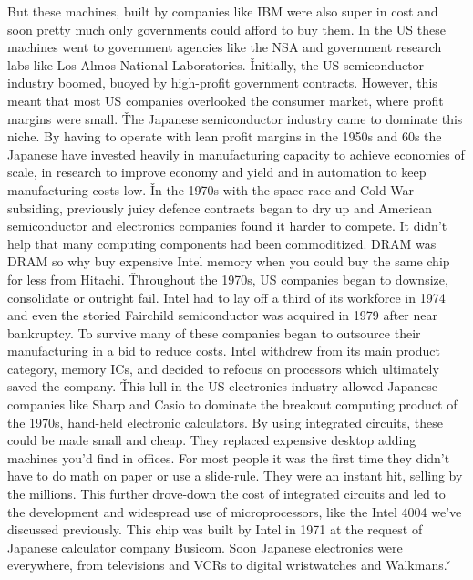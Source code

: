 But these machines, built by companies like IBM were also super in cost and soon pretty much only governments could
afford to buy them. In the US these machines went to government agencies like the NSA and government research labs
like Los Almos National Laboratories. \v

Initially, the US semiconductor industry boomed, buoyed by high-profit government contracts. However, this meant that
most US companies overlooked the consumer market, where profit margins were small. \v

The Japanese semiconductor industry came to dominate this niche. By having to operate with lean profit margins in the
1950s and 60s the Japanese have invested heavily in manufacturing capacity to achieve economies of scale, in research
to improve economy and yield and in automation to keep manufacturing costs low. \v

In the 1970s with the space race and Cold War subsiding, previously juicy defence contracts began to dry up and
American semiconductor and electronics companies found it harder to compete. It didn't help that many computing
components had been commoditized. DRAM was DRAM so why buy expensive Intel memory when you could buy the same chip
for less from Hitachi. \v

Throughout the 1970s, US companies began to downsize, consolidate or outright fail. Intel had to lay off a third of
its workforce in 1974 and even the storied Fairchild semiconductor was acquired in 1979 after near bankruptcy. To
survive many of these companies began to outsource their manufacturing in a bid to reduce costs. Intel withdrew from
its main product category, memory ICs, and decided to refocus on processors which ultimately saved the company. \v

This lull in the US electronics industry allowed Japanese companies like Sharp and Casio to dominate the breakout
computing product of the 1970s, hand-held electronic calculators. By using integrated circuits, these could be made
small and cheap. They replaced expensive desktop adding machines you'd find in offices. For most people it was the
first time they didn't have to do math on paper or use a slide-rule. They were an instant hit, selling by the
millions. This further drove-down the cost of integrated circuits and led to the development and widespread use of
microprocessors, like the Intel 4004 we've discussed previously. This chip was built by Intel in 1971 at the request
of Japanese calculator company Busicom. Soon Japanese electronics were everywhere, from televisions and VCRs to
digital wristwatches and Walkmans. \v

